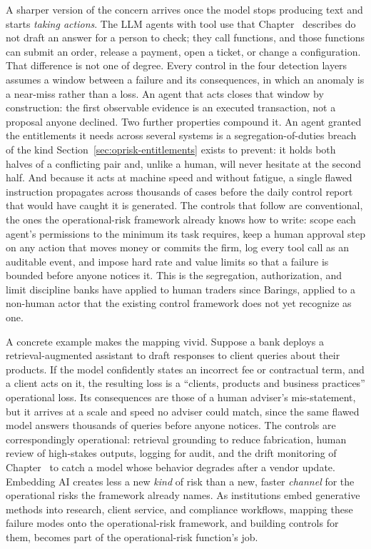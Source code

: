 \documentclass[../ai_in_finance]{subfiles}
\begin{document}
A sharper version of the concern arrives once the model stops producing text and starts \emph{taking actions}. The LLM agents with tool use that Chapter~ describes do not draft an answer for a person to check; they call functions, and those functions can submit an order, release a payment, open a ticket, or change a configuration. That difference is not one of degree. Every control in the four detection layers assumes a window between a failure and its consequences, in which an anomaly is a near-miss rather than a loss. An agent that acts closes that window by construction: the first observable evidence is an executed transaction, not a proposal anyone declined. Two further properties compound it. An agent granted the entitlements it needs across several systems is a segregation-of-duties breach of the kind Section~\ref{sec:oprisk-entitlements} exists to prevent: it holds both halves of a conflicting pair and, unlike a human, will never hesitate at the second half. And because it acts at machine speed and without fatigue, a single flawed instruction propagates across thousands of cases before the daily control report that would have caught it is generated. The controls that follow are conventional, the ones the operational-risk framework already knows how to write: scope each agent's permissions to the minimum its task requires, keep a human approval step on any action that moves money or commits the firm, log every tool call as an auditable event, and impose hard rate and value limits so that a failure is bounded before anyone notices it. This is the segregation, authorization, and limit discipline banks have applied to human traders since Barings, applied to a non-human actor that the existing control framework does not yet recognize as one.

A concrete example makes the mapping vivid. Suppose a bank deploys a retrieval-augmented assistant to draft responses to client queries about their products. If the model confidently states an incorrect fee or contractual term, and a client acts on it, the resulting loss is a ``clients, products and business practices'' operational loss. Its consequences are those of a human adviser's mis-statement, but it arrives at a scale and speed no adviser could match, since the same flawed model answers thousands of queries before anyone notices. The controls are correspondingly operational: retrieval grounding to reduce fabrication, human review of high-stakes outputs, logging for audit, and the drift monitoring of Chapter~ to catch a model whose behavior degrades after a vendor update. Embedding AI creates less a new \emph{kind} of risk than a new, faster \emph{channel} for the operational risks the framework already names. As institutions embed generative methods into research, client service, and compliance workflows, mapping these failure modes onto the operational-risk framework, and building controls for them, becomes part of the operational-risk function's job.
\end{document}
